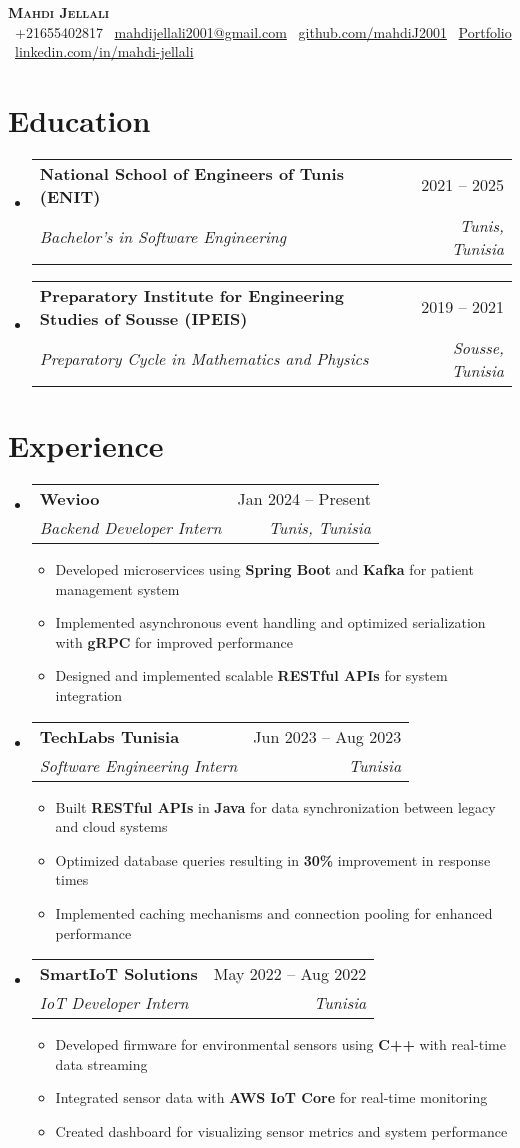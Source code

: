\documentclass[letterpaper,11pt]{article}
\makeatletter
\newcommand{\resumeItem}[1]{
    \item\small{
            {#1 \vspace{-2pt}}
    }
}
\newcommand{\resumeSubheading}[4]{
    \vspace{-2pt}\item
    \begin{tabular*}{0.97\textwidth}[t]{l@{\extracolsep{\fill}}r}
    \textbf{#1} & #2 \\
    \textit{\small#3} & \textit{\small #4} \\
    \end{tabular*}\vspace{-7pt}
}
\newcommand{\resumeSubHeadingListStart}{\begin{itemize}[leftmargin=0.15in, label={}]}
\newcommand{\resumeSubHeadingListEnd}{\end{itemize}}
\newcommand{\resumeItemListStart}{\begin{itemize}}
\newcommand{\resumeItemListEnd}{\end{itemize}\vspace{-5pt}}
\makeatother
\begin{document}
\begin{center}
\textbf{\Huge \scshape Mahdi Jellali} \\ \vspace{1pt}
\small
\faPhone\ +21655402817 \quad
\faEnvelope\ \href{mailto:mahdijellali2001@gmail.com}{mahdijellali2001@gmail.com} \quad
\faGithub\ \href{https://github.com/mahdiJ2001}{github.com/mahdiJ2001} \quad
\faGlobe\ \href{https://concise-code-display.vercel.app/}{Portfolio} \quad
\faLinkedin\ \href{https://www.linkedin.com/in/mahdi-jellali/}{linkedin.com/in/mahdi-jellali}
\end{center}

\vspace{10pt}

\section{Education}
\resumeSubHeadingListStart
\resumeSubheading
{National School of Engineers of Tunis (ENIT)}{2021 -- 2025}
{Bachelor's in Software Engineering}{Tunis, Tunisia}
\resumeSubheading
{Preparatory Institute for Engineering Studies of Sousse (IPEIS)}{2019 -- 2021}
{Preparatory Cycle in Mathematics and Physics}{Sousse, Tunisia}
\resumeSubHeadingListEnd

\section{Experience}
\resumeSubHeadingListStart
\resumeSubheading
{Wevioo}{Jan 2024 -- Present}
{Backend Developer Intern}{Tunis, Tunisia}
\resumeItemListStart
\resumeItem{Developed microservices using \textbf{Spring Boot} and \textbf{Kafka} for patient management system}
\resumeItem{Implemented asynchronous event handling and optimized serialization with \textbf{gRPC} for improved performance}
\resumeItem{Designed and implemented scalable \textbf{RESTful APIs} for system integration}
\resumeItemListEnd

\resumeSubheading
{TechLabs Tunisia}{Jun 2023 -- Aug 2023}
{Software Engineering Intern}{Tunisia}
\resumeItemListStart
\resumeItem{Built \textbf{RESTful APIs} in \textbf{Java} for data synchronization between legacy and cloud systems}
\resumeItem{Optimized database queries resulting in \textbf{30\%} improvement in response times}
\resumeItem{Implemented caching mechanisms and connection pooling for enhanced performance}
\resumeItemListEnd

\resumeSubheading
{SmartIoT Solutions}{May 2022 -- Aug 2022}
{IoT Developer Intern}{Tunisia}
\resumeItemListStart
\resumeItem{Developed firmware for environmental sensors using \textbf{C++} with real-time data streaming}
\resumeItem{Integrated sensor data with \textbf{AWS IoT Core} for real-time monitoring}
\resumeItem{Created dashboard for visualizing sensor metrics and system performance}
\resumeItemListEnd
\resumeSubHeadingListEnd
\end{document}

